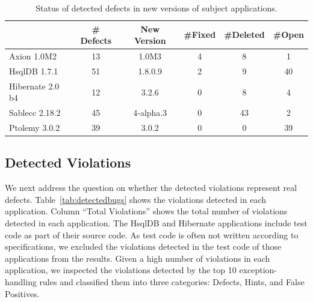 \setlength{\tabcolsep}{1pt}
\begin{table}[t]
\begin{SmallOut}
\begin{CodeOut}
\begin{center}
\centering \caption {\label{tab:defectstatus}  Status of detected defects in new versions of subject applications.}
\begin {tabular} {|l|c|c|c|c|c|}
\hline
&\# Defects&New Version&\#Fixed&\#Deleted&\#Open\\
\hline
\hline Axion 1.0M2& 13&	1.0M3&	4&	8&	1\\
\hline HsqlDB 1.7.1& 51&	1.8.0.9&	2&	9&	40\\
\hline Hibernate 2.0 b4& 12	&3.2.6&	0&	8&	4 \\
\hline Sablecc 2.18.2& 45 &	4-alpha.3	&0	&43&	2\\
\hline Ptolemy 3.0.2& 39	&3.0.2	&0	&0	&39\\
\hline
\end{tabular}
\end{center}
\end{CodeOut}
\end{SmallOut}\vspace*{-4ex}
\end{table}
\vspace*{-2ex}
\subsection{Detected Violations}
\label{sec:violations}
We next address the question on whether the detected violations represent
real defects. Table~\ref{tab:detectedbugs}
shows the violations detected in each application. Column ``Total Violations''
shows the total number of violations detected in each application. 
The HsqlDB and Hibernate applications include test code as part of their source code.
As test code is often not written according to specifications,
we excluded the violations detected in the test code of those applications 
from the results. Given a high number of violations in each application, we inspected the violations
detected by the top 10 exception-handling rules and classified them into three categories: Defects,
Hints, and False Positives. 

